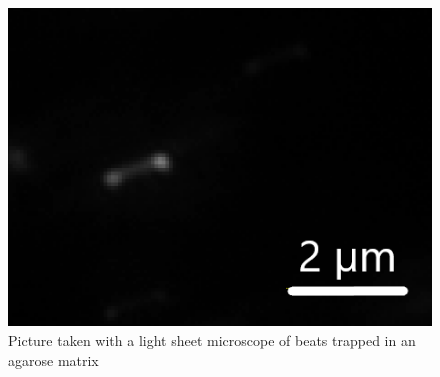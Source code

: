 \begin{figure}[h]
    \centering
    \includegraphics[width = \linewidth]{Bilder/PSF/ZweiObjekteP4NPEdit.png}
    \caption{Picture taken with a light sheet microscope of beats trapped in an agarose matrix}
    \label{fig:VeruecktteBeats}
\end{figure}